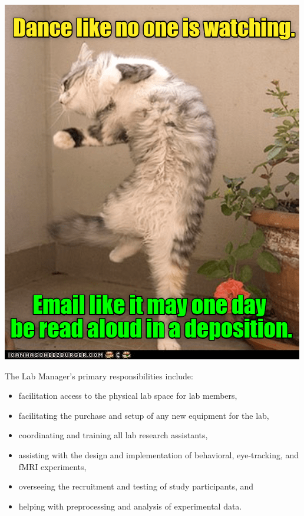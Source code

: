 \documentclass[
]{book}
\providecommand{\tightlist}{%
  \setlength{\itemsep}{0pt}\setlength{\parskip}{0pt}}
\begin{document}
\includegraphics{images/email.png}

The Lab Manager's primary responsibilities include:

\begin{itemize}
\tightlist
\item
  facilitation access to the physical lab space for lab members,
\item
  facilitating the purchase and setup of any new equipment for the lab,\\
\item
  coordinating and training all lab research assistants,\\
\item
  assisting with the design and implementation of behavioral, eye-tracking, and fMRI experiments,\\
\item
  overseeing the recruitment and testing of study participants, and\\
\item
  helping with preprocessing and analysis of experimental data.
\end{itemize}
\end{document}
